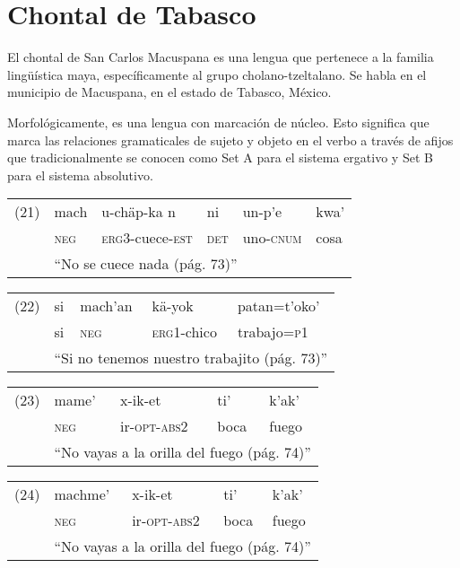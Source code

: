 \section*{Chontal de Tabasco}

\noindent El chontal de San Carlos Macuspana es una lengua que pertenece a la familia lingüística maya, específicamente al grupo cholano-tzeltalano. Se habla en el municipio de Macuspana, en el estado de Tabasco, México.

Morfológicamente, es una lengua con marcación de núcleo. Esto significa que marca las relaciones gramaticales de sujeto y objeto en el verbo a través de afijos que tradicionalmente se conocen como Set A para el sistema ergativo y Set B para el sistema absolutivo.\vspace{0.5cm}

{\setmainfont{Doulos SIL} 
\begin{tabular}{llllll}
(21) & mach & u-chäp-ka n& ni & un-p'e & kwa' \\
& \textsc{neg} & \textsc{erg3}-cuece-\textsc{est} & \textsc{det} & uno-\textsc{cnum} & cosa \\
& \multicolumn{5}{l}{``No se cuece nada (pág. 73)''} \\
\end{tabular} \vspace{0.3cm}

\begin{tabular}{lllll}
(22) & si & mach'an & kä-yok  & patan=t'oko'\\
& si & \textsc{neg} & \textsc{erg1}-chico & trabajo=\textsc{p1}\\
& \multicolumn{4}{l}{``Si no tenemos nuestro trabajito (pág. 73)''} \\
\end{tabular} \vspace{0.3cm}

\begin{tabular}{lllll}
(23) & mame' & x-ik-et & ti' & k'ak' \\
& \textsc{neg} & ir-\textsc{opt-abs2} & boca & fuego\\
& \multicolumn{4}{l}{``No vayas a la orilla del fuego (pág. 74)''} \\
\end{tabular} \vspace{0.3cm}

\begin{tabular}{lllll}
(24) & machme' & x-ik-et & ti' & k'ak' \\
& \textsc{neg} & ir-\textsc{opt-abs2} & boca & fuego\\
& \multicolumn{4}{l}{``No vayas a la orilla del fuego (pág. 74)''} \\
\end{tabular} \vspace{0.3cm}

}
